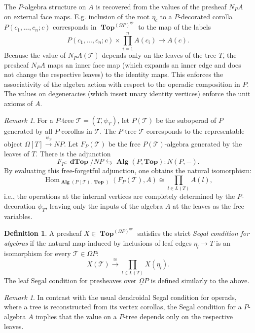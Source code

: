 \documentclass{amsart}
\theoremstyle{definition}
\newtheorem{definition}[formula]{Definition}
\theoremstyle{remark}
\newtheorem{remark}[formula]{Remark}
\DeclareMathOperator{\Hm}{Hom}
\DeclareMathOperator{\Top}{\mathbf{Top}}
\DeclareMathOperator{\Alg}{\mathbf{Alg}}
\DeclareMathOperator{\dTop}{\mathbf{dTop}}
\newcommand{\rcolon}{\mathrel{}\colon\!}
\begin{document}
	The $P$-algebra structure on $A$ is recovered from the values of the presheaf $N_{P}A$ on external face maps.
	E.g. inclusion of the root $\eta_{c}$ to a $P$-decorated corolla $P(c_{1},\dots,c_{n};c)$ corresponds in $\Top^{(\Omega P)^{op}}$ to the map of the labels
	\[
		P(c_{1},\dots,c_{n};c)\times \prod_{i=1}^{n} A(c_{i})\to A(c).
	\]
	Because the value of $N_P A(\mathcal{T})$ depends only on the leaves of the tree $T$, the presheaf $N_{P} A$ maps an inner face map (which expands an inner edge and does not change the respective leaves) to the identity maps. 
	This enforces the associativity of the algebra action with respect to the operadic composition in $P$. 
	The values on degeneracies (which insert unary identity vertices) enforce the unit axioms of $A$.

	\begin{remark}
	For a $P$-tree $\mathcal{T}=(T,\psi_{T})$, let $P(\mathcal{T})$ be the suboperad of $P$ generated by all $P$-corollas in $\mathcal{T}$.
	The $P$-tree $\mathcal{T}$ corresponds to the representable object $\Omega[T] \xrightarrow{\psi_{T}} NP$. 
	Let $F_{P}(\mathcal{T})$ be the free $P(\mathcal{T})$-algebra generated by the leaves of $T$. 
	There is the adjunction~\cite[\S9.5, p.~394]{he-mo-22}
	\[
		F_{P}\colon \dTop/NP \leftrightarrows 	\Alg(P, \mathbf{Top})\rcolon N(P, -).
	\]
	By evaluating this free-forgetful adjunction, one obtains the natural isomorphism:
	\[
		\Hm_{\Alg(P(\mathcal{T}), \Top)}(F_{P}(\mathcal{T}), A) \cong \prod_{l\in L(T)} A(l),
	\]
	i.e., the operations at the internal vertices are completely determined by the $P$-decoration $\psi_{T}$, leaving only the inputs of the algebra $A$ at the leaves as the free variables.
\end{remark}

	
	\begin{definition}\label{def:segal}
		A presheaf $X\in\Top^{(\Omega P)^{op}}$ satisfies the strict \emph{Segal condition for algebras} if 
		the natural map induced by inclusions of leaf edges $\eta_{l}\to T$ 
		is an isomorphism for every $\mathcal{T}\in \Omega P$:
			\[
				X(\mathcal{T})\overset{\cong}{\to}\prod_{l\in L(T)} X(\eta_{l}).
			\]
		The leaf Segal condition for presheaves over $\underline{\Omega} P$ is defined similarly to the above.
	\end{definition}
	
	\begin{remark}\label{rem:simseg}
	In contrast with the usual dendroidal Segal condition for operads, where a tree is reconstructed from its vertex corollas, the Segal condition for a $P$-algebra $A$ implies that the value on a $P$-tree depends only on the respective leaves. 
	\end{remark}
	
\end{document}
